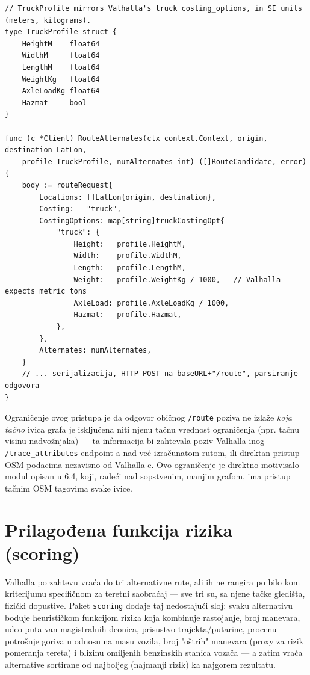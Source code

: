 \newpage
\begin{lstlisting}[caption={[Mapiranje profila vozila u Valhalla \texttt{costing\_options}]\texttt{valhalla.Client.RouteAlternates} — mapiranje profila vozila u Valhalla \texttt{costing\_options} (\texttt{backend/internal/valhalla/client.go})}]
// TruckProfile mirrors Valhalla's truck costing_options, in SI units (meters, kilograms).
type TruckProfile struct {
	HeightM    float64
	WidthM     float64
	LengthM    float64
	WeightKg   float64
	AxleLoadKg float64
	Hazmat     bool
}

func (c *Client) RouteAlternates(ctx context.Context, origin, destination LatLon,
	profile TruckProfile, numAlternates int) ([]RouteCandidate, error) {
	body := routeRequest{
		Locations: []LatLon{origin, destination},
		Costing:   "truck",
		CostingOptions: map[string]truckCostingOpt{
			"truck": {
				Height:   profile.HeightM,
				Width:    profile.WidthM,
				Length:   profile.LengthM,
				Weight:   profile.WeightKg / 1000,   // Valhalla expects metric tons
				AxleLoad: profile.AxleLoadKg / 1000,
				Hazmat:   profile.Hazmat,
			},
		},
		Alternates: numAlternates,
	}
	// ... serijalizacija, HTTP POST na baseURL+"/route", parsiranje odgovora
}
\end{lstlisting}

Ograničenje ovog pristupa je da odgovor običnog \texttt{/route} poziva ne izlaže \emph{koja tačno} ivica grafa je isključena niti njenu tačnu vrednost ograničenja (npr. tačnu visinu nadvožnjaka) — ta informacija bi zahtevala poziv Valhalla-inog \texttt{/trace\_attributes} endpoint-a nad već izračunatom rutom, ili direktan pristup OSM podacima nezavisno od Valhalla-e. Ovo ograničenje je direktno motivisalo modul opisan u 6.4, koji, radeći nad sopstvenim, manjim grafom, ima pristup tačnim OSM tagovima svake ivice.

\section{Prilagođena funkcija rizika (scoring)}

Valhalla po zahtevu vraća do tri alternativne rute, ali ih ne rangira po bilo kom kriterijumu specifičnom za teretni saobraćaj — sve tri su, sa njene tačke gledišta, fizički dopustive. Paket \texttt{scoring} dodaje taj nedostajući sloj: svaku alternativu boduje heurističkom funkcijom rizika koja kombinuje rastojanje, broj manevara, udeo puta van magistralnih deonica, prisustvo trajekta/putarine, procenu potrošnje goriva u odnosu na masu vozila, broj "oštrih" manevara (proxy za rizik pomeranja tereta) i blizinu omiljenih benzinskih stanica vozača — a zatim vraća alternative sortirane od najboljeg (najmanji rizik) ka najgorem rezultatu.

